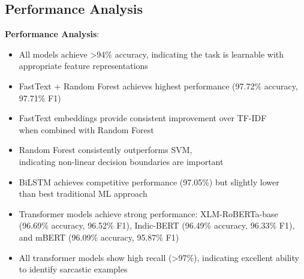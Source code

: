 \documentclass[11pt]{article}
\begin{document}
\begin{table}[h]
\centering
\small
{}
\caption{Model performance comparison on test set (3,020 samples from 15,099 total,\\ 80/20 stratified split). Best results in bold.}
\label{tab:results}
\end{table}


\subsection{Performance Analysis}

\textbf{Performance Analysis}:
\begin{itemize}
\item All models achieve >94\% accuracy, indicating the task is learnable with appropriate feature representations
\item FastText + Random Forest achieves highest performance (97.72\% accuracy, 97.71\% F1)
\item FastText embeddings provide consistent improvement over TF-IDF\\ when combined with Random Forest
\item Random Forest consistently outperforms SVM,\\ indicating non-linear decision boundaries are important
\item BiLSTM achieves competitive performance (97.05\%) but slightly lower\\ than best traditional ML approach
\item Transformer models achieve strong performance: XLM-RoBERTa-base (96.69\% accuracy, 96.52\% F1), Indic-BERT (96.49\% accuracy, 96.33\% F1), and mBERT (96.09\% accuracy, 95.87\% F1)
\item All transformer models show high recall (>97\%), indicating excellent ability to identify sarcastic examples
\end{itemize}
\end{document}

